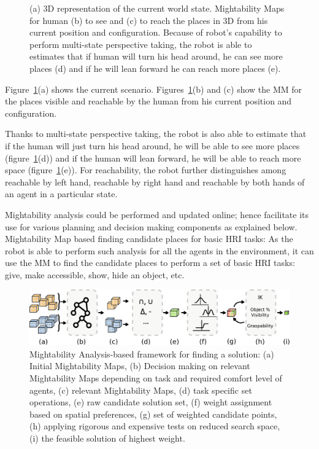 \documentclass{svmult}
\begin{document}
\begin{figure}[ht!]
   \caption{%
		(a) 3D representation of the current world state. Mightability Maps for
		human (b) to see and (c) to reach the places in 3D from his current
		position and configuration. Because of robot's capability to perform
		multi-state perspective taking, the robot is able to estimates that if
		human will turn his head around, he can see more places (d) and if he
		will lean forward he can reach more places (e).
   }
		
   \label{fig|mightabilities}
\end{figure}

Figure~\ref{fig|mightabilities}(a) shows the current scenario.
Figures~\ref{fig|mightabilities}(b) and (c) show the MM for the places visible
and reachable by the human from his current position and configuration.

Thanks to multi-state perspective taking, the robot is also able to estimate
that if the human will just turn his head around, he will be able to see more
places (figure~\ref{fig|mightabilities}(d)) and if the human will lean forward,
he will be able to reach more space (figure~\ref{fig|mightabilities}(e)). For
reachability, the robot further distinguishes among reachable by left hand,
reachable by right hand and reachable by both hands of an agent in a particular
state.  

Mightability analysis could be performed and updated online; hence facilitate
its use for various planning and decision making components as explained below.
Mightability Map based finding candidate places for basic HRI
tasks: As the robot is able to perform such
analysis for all the agents in the environment, it can use the MM to find the
candidate places to perform a set of basic HRI tasks: give, make accessible,
show, hide an object, etc. 

\begin{figure}
  \centering
  \includegraphics[width=\textwidth]{./figs/mightab-steps.pdf}

\caption { Mightability Analysis-based framework for finding a solution: (a)
Initial Mightability Maps, (b) Decision making on relevant Mightability Maps
depending on task and required comfort level of agents, (c) relevant
Mightability Maps, (d) task specific set operations, (e) raw candidate solution
set, (f) weight assignment based on spatial preferences, (g) set of weighted
candidate points, (h) applying rigorous and expensive tests on reduced search
space, (i) the feasible solution of highest weight.}

  \label{fig|mightabilities-framework}
\end{figure}
\end{document}
